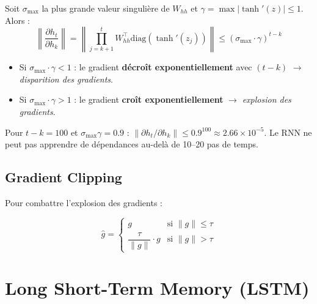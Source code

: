 \begin{theoreme}
Soit $\sigma_{\max}$ la plus grande valeur singuli\`ere de $W_{hh}$ et
$\gamma = \max |\tanh'(z)| \leq 1$. Alors :
\begin{equation}
\left\|\frac{\partial h_t}{\partial h_k}\right\|
= \left\|\prod_{j=k+1}^{t} W_{hh}^\top \text{diag}(\tanh'(z_j))\right\|
\leq (\sigma_{\max} \cdot \gamma)^{t-k}
\label{eq:gradient-bound}
\end{equation}

\begin{itemize}
  \item Si $\sigma_{\max} \cdot \gamma < 1$ : le gradient
    \textbf{d\'ecro\^it exponentiellement} avec $(t-k)$ $\to$
    \emph{disparition des gradients}.
  \item Si $\sigma_{\max} \cdot \gamma > 1$ : le gradient
    \textbf{cro\^it exponentiellement} $\to$ \emph{explosion des gradients}.
\end{itemize}
\end{theoreme}

\begin{attention}[title=\textbf{Cons\'equence pratique}]
Pour $t - k = 100$ et $\sigma_{\max} \gamma = 0.9$ :
$\|\partial h_t / \partial h_k\| \leq 0.9^{100} \approx 2.66 \times 10^{-5}$.
Le RNN ne peut pas apprendre de d\'ependances au-del\`a de 10--20 pas de temps.
\end{attention}

\subsection{Gradient Clipping}

Pour combattre l'explosion des gradients :
\begin{formules}[title=\textbf{Gradient Clipping par norme}]
\begin{equation}
\hat{g} = \begin{cases}
g & \text{si } \|g\| \leq \tau \\[4pt]
\dfrac{\tau}{\|g\|} \cdot g & \text{si } \|g\| > \tau
\end{cases}
\label{eq:grad-clip}
\end{equation}
\end{formules}

\section{Long Short-Term Memory (LSTM)}
\label{sec:lstm}

